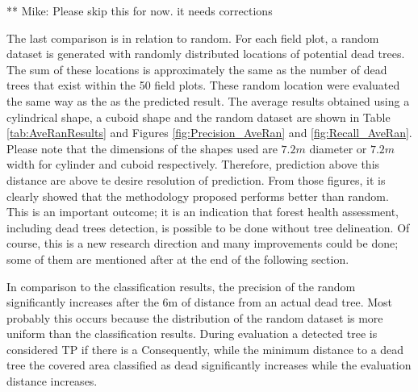 \documentclass{subfiles}
\begin{document}
        \newpage
        {\color{red} ** Mike: Please skip this for now. it needs corrections}
        \par The last comparison is in relation to random. For each field plot, a random dataset is generated with randomly distributed locations of potential dead trees. The sum of these locations is approximately the same as the number of dead trees that exist within the 50 field plots. These random location were evaluated the same way as the as the predicted result. The average results obtained using a cylindrical shape, a cuboid shape and the random dataset are shown in Table \ref{tab:AveRanResults} and Figures \ref{fig:Precision_AveRan} and \ref{fig:Recall_AveRan}. Please note that the dimensions of the shapes used are $7.2m$ diameter or $7.2m$ width for cylinder and cuboid respectively. Therefore, prediction above this distance are above te desire resolution of prediction. From those figures, it is clearly showed that the methodology proposed performs better than random. This is an important outcome; it is an indication that forest health assessment, including dead trees detection, is possible to be done without tree delineation. Of course, this is a new research direction and many improvements could be done; some of them are mentioned after at the end of the following section. 
    
        \par In comparison to the classification results, the precision of the random significantly increases after the 6m of distance from an actual dead tree. Most probably this occurs because the distribution of the random dataset is more uniform than the classification results. During evaluation a detected tree is considered TP if there is a  Consequently, while the minimum distance to a dead tree   the covered area classified as dead significantly increases while the evaluation distance increases.
        
\end{document}
